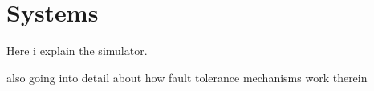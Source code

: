 \chapter{Systems}
Here i explain the simulator.

also going into detail about how fault tolerance mechanisms work therein
